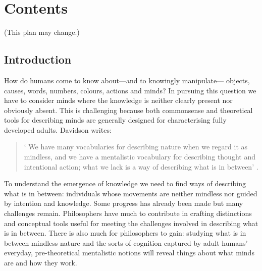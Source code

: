\documentclass[12pt,\papersize]{extarticle}
\begin{document}
\section{Contents}
(This plan may change.)


\subsection{Introduction}
How do humans come to know  about---and to knowingly manipulate---%
objects,
causes,
words,
numbers,
colours,
actions
and
minds?
In pursuing this question we have to consider minds where the knowledge is neither clearly present nor obviously absent. 
This is challenging because both commonsense and theoretical tools for describing minds are generally designed for characterising fully developed adults. 
Davidson writes:
%
\begin{quote}
`%
We have many vocabularies for describing nature when we regard it as mindless, and we have a mentalistic vocabulary for describing thought and intentional action; what we lack is a way of describing what is in between' \citep[p.\ 11]{Davidson:1999ju}.
\end{quote}
%
%
To understand the emergence of knowledge we need to find ways of describing what is in between: individuals whose movements are neither mindless nor guided by intention and knowledge.  
Some progress has already been made but many challenges remain. 
Philosophers have much to contribute in crafting distinctions and conceptual tools useful for meeting the challenges involved in describing what is in between. 
There is also much for philosophers to gain: studying what is in between mindless nature and the sorts of cognition captured by  adult humans' everyday, pre-theoretical mentalistic notions 
 will reveal things about what minds are and how they work.
\end{document}
